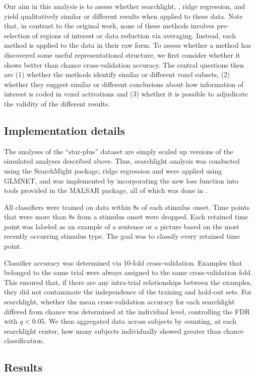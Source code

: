 Our aim in this analysis is to assess whether searchlight, {\lasso}, ridge regression, and {\soslasso} yield qualitatively similar or different results when applied to these data. Note that, in contrast to the original work, none of these methods involves pre-selection of regions of interest or data reduction via averaging. Instead, each method is applied to the data in their raw form. To assess whether a method has discovered some useful representational structure, we first consider whether it shows better than chance cross-validation accuracy. The central questions then are (1) whether the methods identify similar or different voxel subsets, (2) whether they suggest similar or different conclusions about how information of interest is coded in voxel activations and (3) whether it is possible to adjudicate the validity of the different results.

\subsection{Implementation details}
The analyses of the ``star-plus'' dataset are simply scaled up versions of the simulated analyses described above. Thus, searchlight analysis was conducted using the SearchMight package, ridge regression and {\lasso} were applied using GLMNET, and {\soslasso} was implemented by incorporating the new loss function into tools provided in the MALSAR package, all of which was done in \matlab. 

All classifiers were trained on data within 8s of each stimulus onset. Time points that were more than 8s from a stimulus onset were dropped. Each retained time point was labeled as an example of a sentence or a picture based on the most recently occurring stimulus type. The goal was to classify every retained time point.

Classifier accuracy was determined via 10-fold cross-validation. Examples that belonged to the same trial were always assigned to the same cross-validation fold. This ensured that, if there are any intra-trial relationships between the examples, they did not contaminate the independence of the training and hold-out sets. For searchlight, whether the mean cross-validation accuracy for each searchlight differed from chance was determined at the individual level, controlling the FDR with $q < 0.05$. We then aggregated data across subjects by counting, at each searchlight center, how many subjects individually showed greater than chance classification. 

\subsection{Results}

